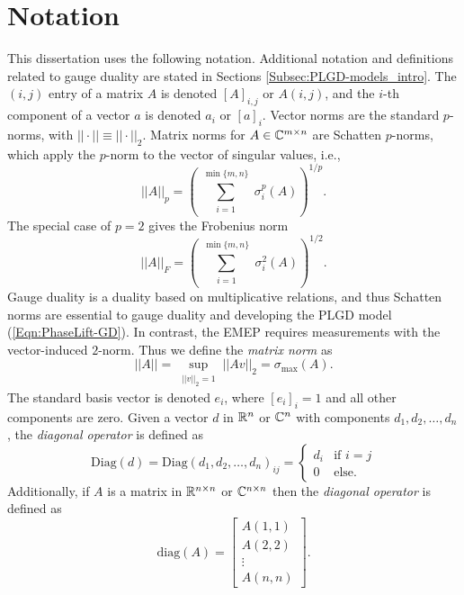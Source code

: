\section{Notation} 		\label{Subsec:intro-notation}


This dissertation uses the following notation.  Additional notation and definitions related to gauge duality are stated in Sections \ref{Subsec:PLGD-models_intro}.  The $(i,j)$ entry of a matrix $A$ is denoted $[A]_{i,j}$ or $A(i,j)$, and the $i$-th component of a vector $a$ is denoted $a_i$ or $[a]_i$.  Vector norms are the standard $p$-norms, with $||\cdot|| \equiv || \cdot ||_2$.   Matrix norms for $A \in {\mathbb C}^{m \times n}$ are Schatten $p$-norms, which apply the  $p$-norm to the vector of singular values, i.e.,
\begin{equation}  \label{Def:shatten_norms}
||A||_p  = \left( \sum_{\substack{i = 1}}^{\substack{\min\{m, n \}}} \sigma_i^p(A) \right)^{1/p}.
\end{equation}
The special case of $p = 2$ gives the Frobenius norm
\begin{equation} 	\label{Def:Frobenius_norm}
||A||_F = \left(   \sum_{\substack{i = 1}}^{\substack{\min\{m, n \}}} \sigma_i^2(A)  \right)^{1/2}.
\end{equation}
Gauge duality is a duality based on multiplicative relations, and thus Schatten norms are essential to gauge duality and developing the PLGD model (\ref{Eqn:PhaseLift-GD}).  In contrast, the EMEP requires measurements with the vector-induced $2$-norm.  Thus we define the \textit{matrix norm} as
\begin{equation} 		\label{Def:matrix_norm}
||A|| = \sup_{\substack{||v||_2 = 1}} ||Av||_2 = \sigma_{\max}(A).
\end{equation}
The standard basis vector is denoted $e_i$, where $[e_i]_i = 1$ and all other components are zero.  
Given a vector $d$ in ${\mathbb R}^n$ or ${\mathbb C}^n$ with components $d_1, d_2, \ldots, d_n$, the \textit{diagonal operator} is defined as
\begin{equation}
\text{Diag}(d) = \text{Diag}(d_1, d_2, \ldots, d_n)_{ij} = 
	\begin{cases}
		d_i 		&		\text{if } i = j	\\
		0		&	\text{else}.
	\end{cases}
\end{equation}
Additionally, if $A$ is a matrix in ${\mathbb R}^{n \times n}$ or ${\mathbb C}^{n \times n}$ then the \textit{diagonal operator} is defined as
\begin{equation}
\text{diag}(A) = 
	\begin{bmatrix}
		A(1,1)	\\
		A(2,2)	\\
		\vdots	\\
		A(n,n)
	\end{bmatrix}.
\end{equation}

